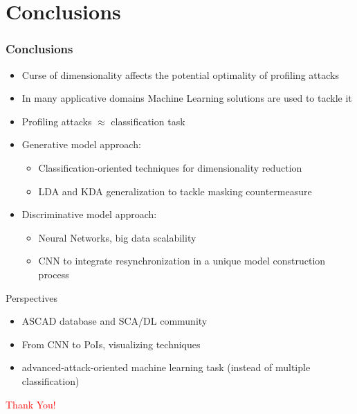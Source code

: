 
\section{Conclusions}

\begin{frame}
\frametitle{Conclusions}
\begin{itemize}
\item Curse of dimensionality affects the potential optimality of profiling attacks
\item In many applicative domains Machine Learning solutions are used to tackle it
\item Profiling attacks $\approx$ classification task
\item Generative model approach:
\begin{itemize}
\item Classification-oriented techniques for dimensionality reduction 
\item LDA and KDA generalization to tackle masking countermeasure
\end{itemize}
\item Discriminative model approach:
\begin{itemize}
\item Neural Networks, big data scalability
\item CNN to integrate resynchronization in a unique model construction process
\end{itemize}
\end{itemize}
\pause
\begin{block}{Perspectives}
\begin{itemize}
\item ASCAD database and SCA/DL community
\item From CNN to PoIs, visualizing techniques
\item advanced-attack-oriented machine learning task (instead of multiple classification)
\end{itemize}
\end{block}
\pause
\vspace{30pt}
\begin{huge}
\textcolor{red}{\hfill Thank You!}
\end{huge}

\end{frame}

